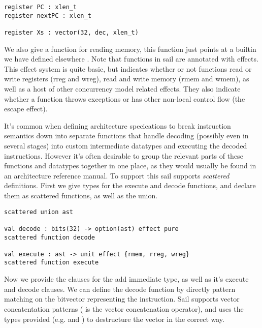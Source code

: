 \begin{lstlisting}
register PC : xlen_t
register nextPC : xlen_t

register Xs : vector(32, dec, xlen_t)
\end{lstlisting}

\sailrX
\sailfnrX
\sailfnrXA

\sailwX
\sailfnwX
\sailX

We also give a function  for reading memory, this function
just points at a builtin we have defined elsewhere . Note that functions in sail are
annotated with effects. This effect system is quite basic, but
indicates whether or not functions read or write registers (rreg and
wreg), read and write memory (rmem and wmem), as well as a host of
other concurrency model related effects. They also indicate whether a
function throws exceptions or has other non-local control flow (the
escape effect).

\sailMEMr
\sailfnMEMr

It's common when defining architecture specications to break
instruction semantics down into separate functions that handle
decoding (possibly even in several stages) into custom intermediate
datatypes and executing the decoded instructions. However it's often
desirable to group the relevant parts of these functions and datatypes
together in one place, as they would usually be found in an
architecture reference manual. To support this sail supports
\emph{scattered} definitions. First we give types for the execute and
decode functions, and declare them as scattered functions, as well as
the  union.

\sailiop

\begin{lstlisting}
scattered union ast

val decode : bits(32) -> option(ast) effect pure
scattered function decode

val execute : ast -> unit effect {rmem, rreg, wreg}
scattered function execute
\end{lstlisting}

Now we provide the clauses for the add immediate  type, as
well as it's execute and decode clauses. We can define the decode
function by directly pattern matching on the bitvector representing
the instruction. Sail supports vector concatentation patterns (
is the vector concatenation operator), and uses the types provided
(e.g.  and ) to destructure the vector in the
correct way.

